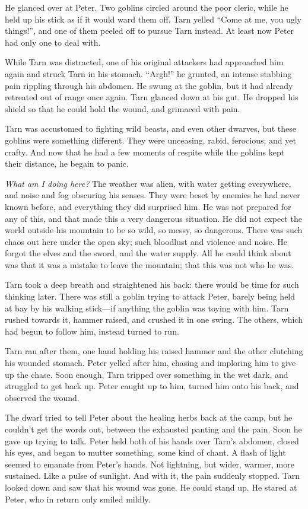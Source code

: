 He glanced over at Peter.  Two goblins circled around the poor cleric, while he held up his stick as if it would ward them off.  Tarn yelled ``Come at me, you ugly things!'', and one of them peeled off to pursue Tarn instead.  At least now Peter had only one to deal with.

While Tarn was distracted, one of his original attackers had approached him again and struck Tarn in his stomach.  ``Argh!'' he grunted, an intense stabbing pain rippling through his abdomen.  He swung at the goblin, but it had already retreated out of range once again.  Tarn glanced down at his gut.  He dropped his shield so that he could hold the wound, and grimaced with pain.

Tarn was accustomed to fighting wild beasts, and even other dwar\-ves, but these goblins were something different.  They were unceasing, rabid, ferocious; and yet crafty.  And now that he had a few moments of respite while the goblins kept their distance, he begain to panic.

\emph{What am I doing here?}  The weather was alien, with water getting everywhere, and noise and fog obscuring his senses.  They were beset by enemies he had never known before, and everything they did surprised him.  He was not prepared for any of this, and that made this a very dangerous situation.  He did not expect the world outside his mountain to be so wild, so messy, so dangerous.  There was such chaos out here under the open sky; such bloodlust and violence and noise.  He forgot the elves and the sword, and the water supply.  All he could think about was that it was a mistake to leave the mountain; that this was not who he was.

Tarn took a deep breath and straightened his back: there would be time for such thinking later.  There was still a goblin trying to attack Peter, barely being held at bay by his walking stick---if anything the goblin was toying with him.  Tarn rushed towards it, hammer raised, and crushed it in one swing.  The others, which had begun to follow him, instead turned to run.

Tarn ran after them, one hand holding his raised hammer and the other clutching his wounded stomach.  Peter yelled after him, chasing and imploring him to give up the chase.  Soon enough, Tarn tripped over something in the wet dark, and struggled to get back up.  Peter caught up to him, turned him onto his back, and observed the wound.

The dwarf tried to tell Peter about the healing herbs back at the camp, but he couldn't get the words out, between the exhausted panting and the pain.  Soon he gave up trying to talk.  Peter held both of his hands over Tarn's abdomen, closed his eyes, and began to mutter something, some kind of chant.  A flash of light seemed to emanate from Peter's hands.  Not lightning, but wider, warmer, more sustained.  Like a pulse of sunlight.  And with it, the pain suddenly stopped.  Tarn looked down and saw that his wound was gone.  He could stand up.  He stared at Peter, who in return only smiled mildly.

